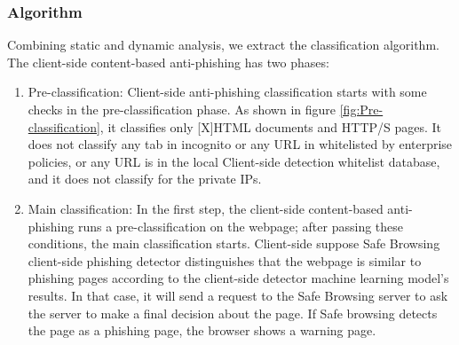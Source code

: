 \subsubsection{Algorithm}

Combining static and dynamic analysis, we extract the classification algorithm. The client-side content-based anti-phishing has two phases:

\begin{enumerate}
    \item Pre-classification: Client-side anti-phishing classification starts with some checks in the pre-classification phase. As shown in figure \ref{fig:Pre-classification}, it classifies only [X]HTML documents and HTTP/S pages. It does not classify any tab in incognito or any  URL in whitelisted by enterprise policies, or any URL is in the local Client-side detection whitelist database, and it does not classify for the private IPs.
    
    \item Main classification: In the first step, the client-side content-based anti-phishing runs a pre-classification on the webpage; after passing these conditions, the main classification starts. Client-side suppose Safe Browsing client-side phishing detector distinguishes that the webpage is similar to phishing pages according to the client-side detector machine learning model's results. In that case, it will send a request to the Safe Browsing server to ask the server to make a final decision about the page. If Safe browsing detects the page as a phishing page, the browser shows a warning page.


\end{enumerate}
